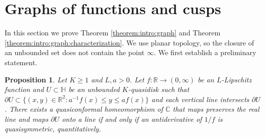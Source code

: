 \documentclass[letterpaper]{amsart}
\theoremstyle{plain}
\newtheorem{proposition}[theorem]{Proposition}
\theoremstyle{definition}
\theoremstyle{remark}
\numberwithin{equation}{section}
\numberwithin{theorem}{section}
\newcommand{\R}{\mathbb R}
\newcommand{\C}{\mathbb C}
\begin{document}
\section{Graphs of functions and cusps}\label{section:graph}

In this section we prove Theorem \ref{theorem:intro:graph} and Theorem \ref{theorem:intro:graph:characterization}. We use planar topology, so the closure of an unbounded set does not contain the point $\infty$. We first establish a preliminary statement.

\begin{proposition}\label{theorem:graph:generalization}
Let $K\geq 1$ and $L,a>0$. Let $f\colon \R\to (0,\infty)$ be an $L$-Lipschitz function and $U\subset \mathbb H$ be an unbounded $K$-quasidisk such that $\partial U\subset \{ (x,y)\in \R^2: a^{-1}f(x)\leq y\leq af(x)\}$ and each vertical line intersects $\partial U$. There exists a quasiconformal homeomorphism of $\C$ that maps preserves the real line and maps $\partial U$ onto a line if and only if an antiderivative of $1/f$ is quasisymmetric, quantitatively.
\end{proposition}
\end{document}
